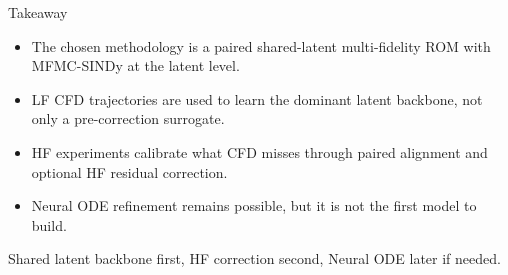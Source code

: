 \documentclass[aspectratio=169]{beamer}
\begin{document}
\begin{frame}{Takeaway}
\begin{itemize}
\item The chosen methodology is a paired shared-latent multi-fidelity ROM with MFMC-SINDy at the latent level.
\item LF CFD trajectories are used to learn the dominant latent backbone, not only a pre-correction surrogate.
\item HF experiments calibrate what CFD misses through paired alignment and optional HF residual correction.
\item Neural ODE refinement remains possible, but it is not the first model to build.
\end{itemize}

\vspace{0.8em}
\centering
\Large
Shared latent backbone first, HF correction second, Neural ODE later if needed.
\end{frame}
\end{document}
